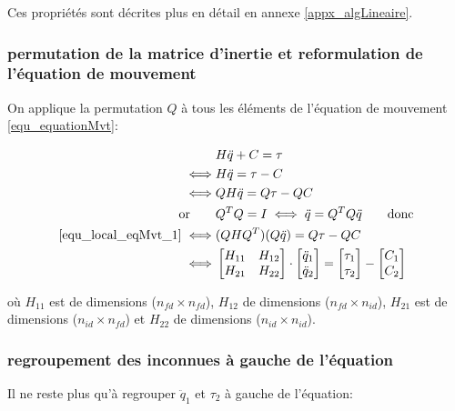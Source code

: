 \documentclass{report}
\begin{document}
Ces propriétés sont décrites plus en détail en annexe \ref{appx_algLineaire}.

\subsubsection{permutation de la matrice d'inertie et reformulation de l'équation de mouvement}

On applique la permutation $Q$ à tous les éléments de l'équation de mouvement \eqref{equ_equationMvt}:
\begin{spacing}{1.5}
\begin{align}
&H \ddot{q} + C = \tau \notag \\
\iff &H \ddot{q} = \tau - C \notag \\
\iff &Q H \ddot{q} = Q \tau - Q C \label{equ_local_eqMvt_1} \\
\textnormal{or} \qquad &Q^T Q = I \iff \ddot{q} = Q^T Q \ddot{q} \qquad \textnormal{donc} \notag \\
\eqref{equ_local_eqMvt_1} \iff &(Q H Q^T) (Q \ddot{q}) = Q \tau - Q C \notag \\
\iff 
&\begin{bmatrix}
  H_{11} & H_{12} \\
  H_{21} & H_{22}
\end{bmatrix} 
\cdot
\begin{bmatrix}
  \ddot{q}_{1} \\
  \ddot{q}_{2}
\end{bmatrix} 
= 
\begin{bmatrix}
  \tau_{1} \\
  \tau_{2}
\end{bmatrix} 
-
\begin{bmatrix}
  C_{1} \\
  C_{2}
\end{bmatrix} \label{equ_local_eqMvt_2}
\end{align}
\end{spacing}

où $H_{11}$ est de dimensions ($n_{fd} \times n_{fd}$), $H_{12}$ de dimensions ($n_{fd} \times n_{id}$), $H_{21}$ est de dimensions ($n_{id} \times n_{fd}$) et $H_{22}$ de dimensions ($n_{id} \times n_{id}$).
\subsubsection{regroupement des inconnues à gauche de l'équation}

Il ne reste plus qu'à regrouper $\ddot{q}_1$ et $\tau_2$ à gauche de l'équation:
\end{document}
